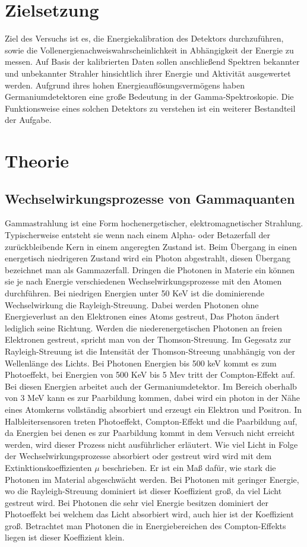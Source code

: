 
\section{Zielsetzung}
\label{sec:Zielsetzung}
Ziel des Versuchs ist es, die Energiekalibration des Detektors durchzuführen, sowie 
die Vollenergienachweiswahrscheinlichkeit in Abhängigkeit der Energie zu messen. Auf Basis der kalibrierten Daten sollen 
anschließend Spektren bekannter und unbekannter Strahler hinsichtlich ihrer Energie und Aktivität ausgewertet werden.
Aufgrund ihres hohen Energieauflösungsvermögens haben Germaniumdetektoren eine große Bedeutung in der Gamma-Spektroskopie.
Die Funktionsweise eines solchen Detektors zu verstehen ist ein weiterer Bestandteil der Aufgabe. 

\section{Theorie}
\label{sec:Theorie}
\subsection{Wechselwirkungsprozesse von Gammaquanten}
Gammastrahlung ist eine Form hochenergetischer, elektromagnetischer Strahlung. Typischerweise entsteht sie wenn nach einem 
Alpha- oder Betazerfall der zurückbleibende Kern in einem angeregten Zustand ist. Beim Übergang in einen energetisch niedrigeren 
Zustand wird ein Photon abgestrahlt, diesen Übergang bezeichnet man als Gammazerfall. Dringen die Photonen in Materie ein können sie 
je nach Energie verschiedenen Wechselwirkungsprozesse mit den Atomen durchführen. Bei niedrigen Energien unter 50 KeV ist die
dominierende Wechselwirkung die Rayleigh-Streuung. Dabei werden Photonen ohne Energieverlust an den Elektronen eines Atoms gestreut,
Das Photon ändert lediglich seine Richtung. Werden die niederenergetischen Photonen an freien Elektronen gestreut, spricht man von der 
Thomson-Streuung. Im Gegesatz zur Rayleigh-Streuung ist die Intensität der Thomson-Streeung unabhängig von der Wellenlänge des Lichts.
Bei Photonen Energien bis 500 keV kommt es zum Photoeffekt, bei Energien von 500 KeV bis 5 Mev tritt der Compton-Effekt auf. Bei diesen 
Energien arbeitet auch der Germaniumdetektor. Im Bereich oberhalb von 3 MeV kann es zur 
Paarbildung kommen, dabei wird ein photon in der Nähe eines Atomkerns vollständig absorbiert und erzeugt ein Elektron und Positron.
In Halbleitersensoren treten Photoeffekt, Compton-Effekt und die Paarbildung auf, da Energien bei denen es zur Paarbildung kommt in dem Versuch
nicht erreicht werden, wird dieser Prozess nicht ausführlicher erläutert. Wie viel Licht in Folge der Wechselwirkungsprozesse absorbiert oder 
gestreut wird wird mit dem Extinktionskoeffizienten $\mu$ beschrieben. Er ist ein Maß dafür, wie stark die Photonen im Material abgeschwächt werden. Bei
Photonen mit geringer Energie, wo die Rayleigh-Streuung dominiert ist dieser Koeffizient groß, da viel Licht gestreut wird. Bei Photonen die sehr 
viel Energie besitzen dominiert der Photoeffekt bei welchem das Licht absorbiert wird, auch hier ist der Koeffizient groß. Betrachtet man Photonen die 
in Energiebereichen des Compton-Effekts liegen ist dieser Koeffizient klein.
\cite{Gammastrahlung}


